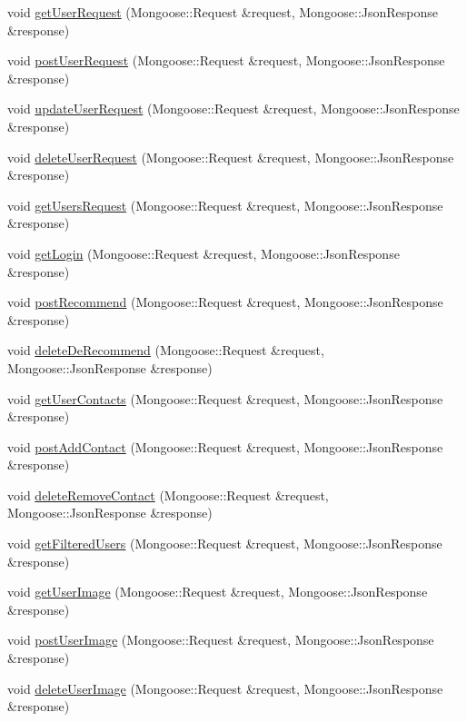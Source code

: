 \begin{DoxyCompactItemize}
\item 
void \hyperlink{classProfileController_aaafe4ee89ae19f73fd56b61456acbe80}{get\+User\+Request} (Mongoose\+::\+Request \&request, Mongoose\+::\+Json\+Response \&response)
\item 
void \hyperlink{classProfileController_af2ef244332d5d22045f8ab31b5830c8c}{post\+User\+Request} (Mongoose\+::\+Request \&request, Mongoose\+::\+Json\+Response \&response)
\item 
void \hyperlink{classProfileController_ae89c5329dc926ecc3ecefd9ab636863b}{update\+User\+Request} (Mongoose\+::\+Request \&request, Mongoose\+::\+Json\+Response \&response)
\item 
void \hyperlink{classProfileController_a8d272e4cf2e65d55b49a0efb4986255b}{delete\+User\+Request} (Mongoose\+::\+Request \&request, Mongoose\+::\+Json\+Response \&response)
\item 
void \hyperlink{classProfileController_a1287630ff84e221d3e8d978d35d58613}{get\+Users\+Request} (Mongoose\+::\+Request \&request, Mongoose\+::\+Json\+Response \&response)
\item 
void \hyperlink{classProfileController_aed795721bdd2b13bd5fc33b0927536fd}{get\+Login} (Mongoose\+::\+Request \&request, Mongoose\+::\+Json\+Response \&response)
\item 
void \hyperlink{classProfileController_ab917338d065d7a3a79e13f7da5ce20d0}{post\+Recommend} (Mongoose\+::\+Request \&request, Mongoose\+::\+Json\+Response \&response)
\item 
void \hyperlink{classProfileController_a9124f7a01dae365a7b4fbdee5049e62b}{delete\+De\+Recommend} (Mongoose\+::\+Request \&request, Mongoose\+::\+Json\+Response \&response)
\item 
void \hyperlink{classProfileController_a9d7756a57238e99fd107ab82dd46a5e4}{get\+User\+Contacts} (Mongoose\+::\+Request \&request, Mongoose\+::\+Json\+Response \&response)
\item 
void \hyperlink{classProfileController_ad7e26392fe25fa7f0b102f66a135f9c2}{post\+Add\+Contact} (Mongoose\+::\+Request \&request, Mongoose\+::\+Json\+Response \&response)
\item 
void \hyperlink{classProfileController_ae6298fa8a5eb65f0e30341cc398a0221}{delete\+Remove\+Contact} (Mongoose\+::\+Request \&request, Mongoose\+::\+Json\+Response \&response)
\item 
void \hyperlink{classProfileController_a7d42c5d2e4deb562e003852c864b0014}{get\+Filtered\+Users} (Mongoose\+::\+Request \&request, Mongoose\+::\+Json\+Response \&response)
\item 
void \hyperlink{classProfileController_affce68fe52a96cfdef96fbf347725f22}{get\+User\+Image} (Mongoose\+::\+Request \&request, Mongoose\+::\+Json\+Response \&response)
\item 
void \hyperlink{classProfileController_a26d4d02998c4564cf364751f295f36ca}{post\+User\+Image} (Mongoose\+::\+Request \&request, Mongoose\+::\+Json\+Response \&response)
\item 
void \hyperlink{classProfileController_a7e3e61e6f8a7357a51a3bd0bb861d13e}{delete\+User\+Image} (Mongoose\+::\+Request \&request, Mongoose\+::\+Json\+Response \&response)
\end{DoxyCompactItemize}


